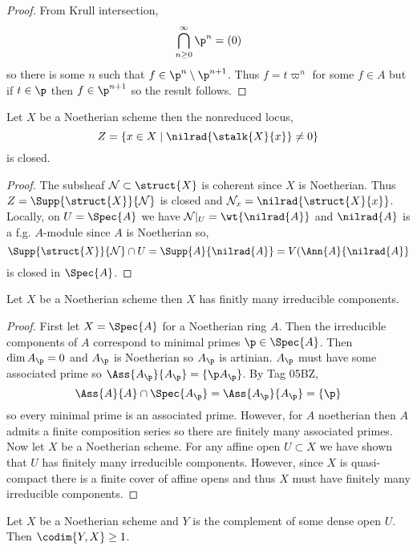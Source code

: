 \documentclass[12pt]{article}
\begin{document}
\begin{proof}
From Krull intersection,
\[ \bigcap_{n \ge 0}^\infty \p^n = (0) \]
so there is some $n$ such that $f \in \p^n \setminus \p^{n+1}$. Thus $f = t \varpi^n$ for some $f \in A$ but if $t \in \p$ then $f \in \p^{n+1}$ so the result follows.
\end{proof}

\begin{lemma}
Let $X$ be a Noetherian scheme then the nonreduced locus,
\[ Z = \{ x \in X \mid \nilrad{\stalk{X}{x}} \neq 0 \} \]
is closed.
\end{lemma} 

\begin{proof}
The subsheaf $\Nil \subset \struct{X}$ is coherent since $X$ is Noetherian. Thus $Z = \Supp{\struct{X}}{\Nil}$ is closed and $\Nil_x = \nilrad{\struct{X}{x}}$. Locally, on $U = \Spec{A}$ we have $\Nil |_U  = \wt{\nilrad{A}}$ and $\nilrad{A}$ is a f.g. $A$-module since $A$ is Noetherian so,
\[ \Supp{\struct{X}}{\Nil} \cap U = \Supp{A}{\nilrad{A}} = V(\Ann{A}{\nilrad{A}} \]
is closed in $\Spec{A}$. 
\end{proof}

\begin{lemma}
Let $X$ be a Noetherian scheme then $X$ has finitly many irreducible components.
\end{lemma}

\begin{proof}
First let $X = \Spec{A}$ for a Noetherian ring $A$. Then the irreducible components of $A$ correspond to minimal primes $\p \in \Spec{A}$. Then $\dim{A_\p} = 0$ and $A_\p$ is Noetherian so $A_\p$ is artinian. $A_\p$ must have some associated prime so $\Ass{A_\p}{A_\p} = \{ \p A_\p \}$.  By Tag 05BZ, 
\[ \Ass{A}{A} \cap \Spec{A_\p} = \Ass{A_\p}{A_\p} = \{ \p \} \] 
so every minimal prime is an associated prime. However, for $A$ noetherian then $A$ admits a finite composition series so there are finitely many associated primes.
\bigskip\\
Now let $X$ be a Noetherian scheme. For any affine open $U \subset X$ we have shown that $U$ has finitely many irreducible components. However, since $X$ is quasi-compact there is a finite cover of affine opens and thus $X$ must have finitely many irreducible components. 
\end{proof}

\begin{lemma} \label{complement_dense_open_codim}
Let $X$ be a Noetherian scheme and $Y$ is the complement of some dense open $U$. Then $\codim{Y, X} \ge 1$.
\end{lemma}
\end{document}
